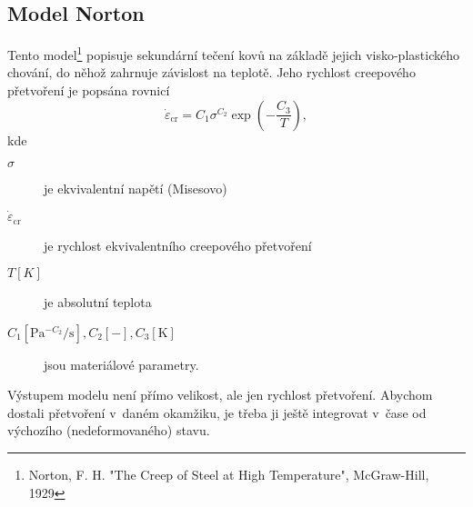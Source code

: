 
\subsection{Model Norton}\label{sec:norton}
Tento model\footnote{Norton, F. H. "The Creep of Steel at High Temperature", McGraw-Hill, 1929} popisuje sekundární tečení kovů na základě jejich visko-plastického chování, do něhož zahrnuje závislost na teplotě.
Jeho rychlost creepového přetvoření je popsána rovnicí 
\begin{equation}
	\dot{\varepsilon}_\text{cr} = C_1 \sigma^{C_2} \exp\left(-\frac{C_3}{T}\right),
\end{equation}
kde
\begin{description}
	\item[$\sigma$] je ekvivalentní napětí (Misesovo)
	\item[$\dot{\varepsilon}_\text{cr}$]je rychlost ekvivalentního creepového přetvoření
	\item[{$T [K]$}] je absolutní teplota
	\item[{$C_1 [\si{\pascal^{-C_2}\per\second}], C_2 [-], C_3 [\si{\kelvin}]$}] jsou materiálové parametry.
\end{description}

Výstupem modelu není přímo velikost, ale jen rychlost přetvoření.
Abychom dostali přetvoření v~daném okamžiku, je třeba ji ještě integrovat v~čase od výchozího (nedeformovaného) stavu.
